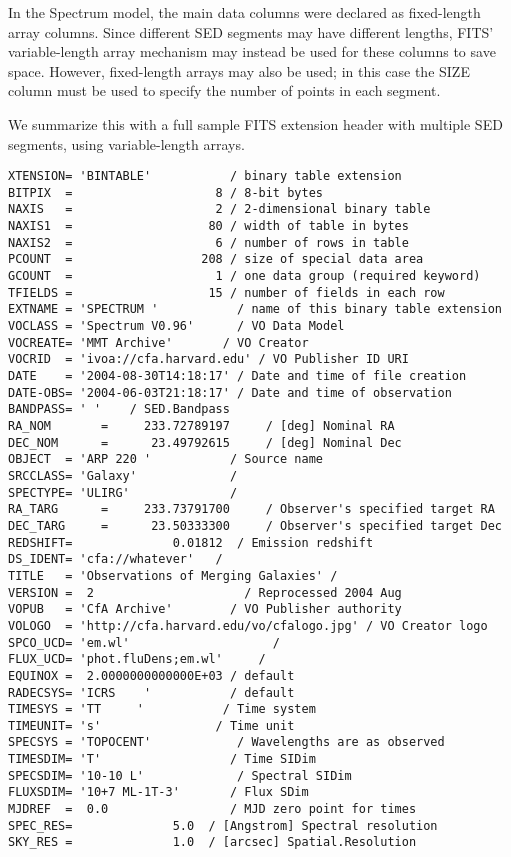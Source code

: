 \documentclass[11pt]{article}
\begin{document}
In the Spectrum model, the main data columns were declared
as fixed-length array columns.
Since different SED segments may have different lengths,
FITS' variable-length array mechanism may instead be used for these columns
to save space. However, fixed-length arrays may also be used; in this
case the SIZE column must be used to 
specify the number of points in each segment.


We summarize this with a full sample FITS extension header with
multiple SED segments, using variable-length arrays.

{ \color{ddblue} \footnotesize
\begin{verbatim}
XTENSION= 'BINTABLE'           / binary table extension
BITPIX  =                    8 / 8-bit bytes
NAXIS   =                    2 / 2-dimensional binary table
NAXIS1  =                   80 / width of table in bytes
NAXIS2  =                    6 / number of rows in table
PCOUNT  =                  208 / size of special data area
GCOUNT  =                    1 / one data group (required keyword)
TFIELDS =                   15 / number of fields in each row
EXTNAME = 'SPECTRUM '           / name of this binary table extension
VOCLASS = 'Spectrum V0.96'      / VO Data Model
VOCREATE= 'MMT Archive'       / VO Creator
VOCRID  = 'ivoa://cfa.harvard.edu' / VO Publisher ID URI
DATE    = '2004-08-30T14:18:17' / Date and time of file creation
DATE-OBS= '2004-06-03T21:18:17' / Date and time of observation
BANDPASS= ' '    / SED.Bandpass
RA_NOM       =     233.72789197     / [deg] Nominal RA    
DEC_NOM      =      23.49792615     / [deg] Nominal Dec   
OBJECT  = 'ARP 220 '           / Source name
SRCCLASS= 'Galaxy'             /
SPECTYPE= 'ULIRG'              /
RA_TARG      =     233.73791700     / Observer's specified target RA
DEC_TARG     =      23.50333300     / Observer's specified target Dec
REDSHIFT=              0.01812  / Emission redshift
DS_IDENT= 'cfa://whatever'   /
TITLE   = 'Observations of Merging Galaxies' /
VERSION =  2                     / Reprocessed 2004 Aug
VOPUB   = 'CfA Archive'        / VO Publisher authority
VOLOGO  = 'http://cfa.harvard.edu/vo/cfalogo.jpg' / VO Creator logo
SPCO_UCD= 'em.wl'                    /
FLUX_UCD= 'phot.fluDens;em.wl'     /
EQUINOX =  2.0000000000000E+03 / default
RADECSYS= 'ICRS    '           / default
TIMESYS = 'TT     '           / Time system
TIMEUNIT= 's'                / Time unit                
SPECSYS = 'TOPOCENT'            / Wavelengths are as observed
TIMESDIM= 'T'                  / Time SIDim 
SPECSDIM= '10-10 L'             / Spectral SIDim
FLUXSDIM= '10+7 ML-1T-3'       / Flux SDim
MJDREF  =  0.0                 / MJD zero point for times
SPEC_RES=              5.0  / [Angstrom] Spectral resolution
SKY_RES =              1.0  / [arcsec] Spatial.Resolution


\end{verbatim}}
\end{document}
